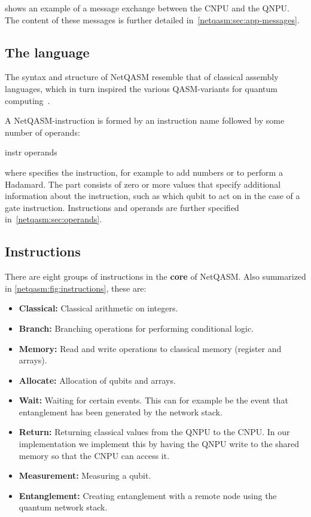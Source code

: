  shows an example of a message exchange between the \ac{CNPU} and the \ac{QNPU}.
The content of these messages is further detailed in~\cref{netqasm:sec:app-messages}.



\subsection{The language}
\label{netqasm:sec:language}
The syntax and structure of \ac{NetQASM} resemble that of classical assembly languages, which in turn inspired the various QASM-variants for quantum computing~\cite{cross2017openqasm, khammassi2018cqasm, fu2019eqasm, liu2017fqasm}.

A \ac{NetQASM}-instruction is formed by an instruction name followed by some number of operands:
\begin{nqcode}
      instr operands
\end{nqcode}
where  specifies the instruction, for example  to add numbers or  to perform a Hadamard.
The  part consists of zero or more values that specify additional information about the instruction, such as which qubit to act on in the case of a gate instruction.
Instructions and operands are further specified in~\cref{netqasm:sec:operands}.

\subsection{Instructions}
\label{netqasm:sec:instructions}
There are eight groups of instructions in the \textbf{core} of \ac{NetQASM}.
Also summarized in \cref{netqasm:fig:instructions}, these are:
\begin{itemize}
      \item \textbf{Classical:} Classical arithmetic on integers.
      \item \textbf{Branch:} Branching operations for performing conditional logic.
      \item \textbf{Memory:} Read and write operations to classical memory (register and arrays).
      \item \textbf{Allocate:} Allocation of qubits and arrays.
      \item \textbf{Wait:} Waiting for certain events. This can for example be the event that entanglement has been generated by the network stack.
      \item \textbf{Return:} Returning classical values from the \ac{QNPU} to the \ac{CNPU}.
            In our implementation we implement this by having the \ac{QNPU} write to the shared memory so that the \ac{CNPU} can access it.
      \item \textbf{Measurement:} Measuring a qubit.
      \item \textbf{Entanglement:} Creating entanglement with a remote node using the quantum network stack.
\end{itemize}

